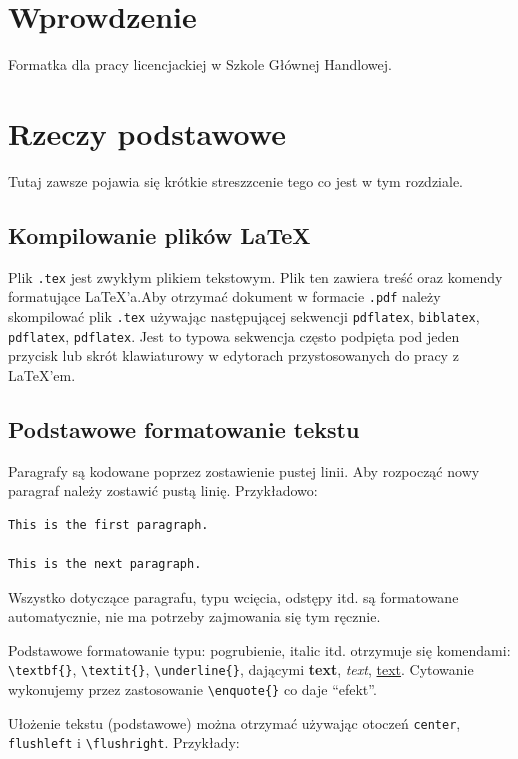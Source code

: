 \documentclass[polish, twoside, 12pt, a4paper]{article}
\theoremstyle{definition}
\theoremstyle{plain}
\theoremstyle{remark}
\begin{document}
\section{Wprowdzenie}

Formatka dla pracy licencjackiej w Szkole Głównej Handlowej.

\clearpage
\section{Rzeczy podstawowe}

Tutaj zawsze pojawia się krótkie streszzcenie tego co jest w tym rozdziale.

\subsection{Kompilowanie plików \LaTeX}

Plik  \verb+.tex+ jest zwykłym plikiem tekstowym. Plik ten zawiera treść oraz komendy formatujące \LaTeX'a.Aby otrzymać dokument w formacie \verb+.pdf+ należy skompilować plik \verb+.tex+ używając następującej sekwencji \verb+pdflatex+, \verb+biblatex+, \verb+pdflatex+, \verb+pdflatex+. Jest to typowa sekwencja często podpięta pod jeden przycisk lub skrót klawiaturowy w edytorach przystosowanych do pracy z \LaTeX'em.

\subsection{Podstawowe formatowanie tekstu}

Paragrafy są kodowane poprzez zostawienie pustej linii. Aby rozpocząć nowy paragraf należy zostawić pustą linię. Przykładowo:
\begin{verbatim}
This is the first paragraph.

This is the next paragraph.
\end{verbatim}

Wszystko dotyczące paragrafu, typu wcięcia, odstępy itd. są formatowane automatycznie, nie ma potrzeby zajmowania się tym ręcznie.

Podstawowe formatowanie typu: pogrubienie, italic itd. otrzymuje się komendami: \verb+\textbf{}+, \verb+\textit{}+, \verb+\underline{}+, dającymi \textbf{text}, \textit{text}, \underline{text}. Cytowanie wykonujemy przez zastosowanie \verb+\enquote{}+ co daje \enquote{efekt}.

Ułożenie tekstu (podstawowe) można otrzymać używając otoczeń \verb+center+, \verb+flushleft+ i \verb+\flushright+. Przykłady:
\end{document}

